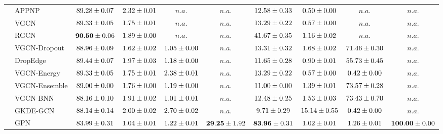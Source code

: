 \begin{table*}[!h]
{\begin{tabular}{ll|cccc|cccc}
        \midrule
        
        & APPNP & ${89.28\tiny \pm 0.07}$ & ${{2.32}\tiny \pm 0.01}$ & $n.a.$ & $n.a.$ & ${12.58\tiny \pm 0.33}$ & ${0.50\tiny \pm 0.00}$ & $n.a.$ & $n.a.$\\
        & VGCN & ${89.33\tiny \pm 0.05}$ & ${1.75\tiny \pm 0.01}$ & $n.a.$ & $n.a.$ & ${13.29\tiny \pm 0.22}$ & ${0.57\tiny \pm 0.00}$ & $n.a.$ & $n.a.$\\
        & RGCN & ${\mathbf{90.50}\tiny \pm 0.06}$ & ${1.89\tiny \pm 0.00}$ & $n.a.$ & $n.a.$ & ${41.67\tiny \pm 0.35}$ & ${1.16\tiny \pm 0.02}$ & $n.a.$ & $n.a.$\\
        & VGCN-Dropout & ${88.96\tiny \pm 0.09}$ & ${1.62\tiny \pm 0.02}$ & ${1.05\tiny \pm 0.00}$ & $n.a.$ & ${13.31\tiny \pm 0.32}$ & ${1.68\tiny \pm 0.02}$ & ${71.46\tiny \pm 0.30}$ & $n.a.$\\
        & DropEdge & ${89.44\tiny \pm 0.07}$ & ${1.97\tiny \pm 0.03}$ & ${1.18\tiny \pm 0.00}$ & $n.a.$ & ${11.65\tiny \pm 0.28}$ & ${0.90\tiny \pm 0.01}$ & ${55.73\tiny \pm 0.45}$ & $n.a.$\\
        & VGCN-Energy & ${89.33\tiny \pm 0.05}$ & ${1.75\tiny \pm 0.01}$ & ${2.38\tiny \pm 0.01}$ & $n.a.$ & ${13.29\tiny \pm 0.22}$ & ${0.57\tiny \pm 0.00}$ & ${0.42\tiny \pm 0.00}$ & $n.a.$\\
        & VGCN-Ensemble & ${89.00\tiny \pm 0.00}$ & ${1.76\tiny \pm 0.00}$ & ${1.19\tiny \pm 0.00}$ & $n.a.$ & ${11.00\tiny \pm 0.00}$ & ${1.39\tiny \pm 0.01}$ & ${{73.57}\tiny \pm 0.28}$ & $n.a.$\\
        & VGCN-BNN & ${88.16\tiny \pm 0.10}$ & ${1.91\tiny \pm 0.02}$ & ${1.01\tiny \pm 0.01}$ & $n.a.$ & ${12.48\tiny \pm 0.25}$ & ${1.53\tiny \pm 0.03}$ & ${73.43\tiny \pm 0.70}$ & $n.a.$\\
        & GKDE-GCN & ${88.14\tiny \pm 0.14}$ & ${2.00\tiny \pm 0.02}$ & ${{2.70}\tiny \pm 0.02}$ & $n.a.$ & ${9.71\tiny \pm 0.29}$ & ${{15.14}\tiny \pm 0.55}$ & ${0.42\tiny \pm 0.00}$ & $n.a.$\\
        & GPN & ${83.99\tiny \pm 0.31}$ & ${1.04\tiny \pm 0.01}$ & ${1.22\tiny \pm 0.01}$ & ${\mathbf{29.25}\tiny \pm 1.92}$ & ${\mathbf{83.96}\tiny \pm 0.31}$ & ${1.02\tiny \pm 0.01}$ & ${1.26\tiny \pm 0.01}$ & ${\mathbf{100.00}\tiny \pm 0.00}$\\


\end{tabular}}
\end{table*}
